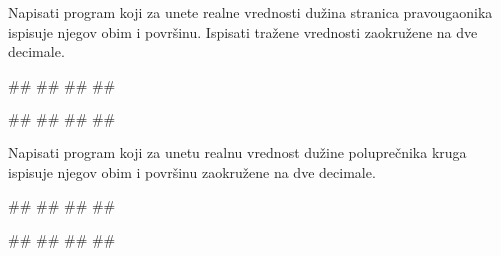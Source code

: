 
\begin{Exercise}[label=UZ_NI_21] 
Napisati program koji za unete realne vrednosti dužina stranica pravougaonika ispisuje 
njegov obim i površinu. Ispisati tražene vrednosti zaokružene na dve decimale.

\begin{miditest}
\begin{upotreba}{1}
#\naslovInt#
##
##
##
\end{upotreba}
\end{miditest}
\begin{miditest}
\begin{upotreba}{2}
#\naslovInt#
##
##
##
\end{upotreba}
\end{miditest}

\end{Exercise}
\ifresenja
\begin{Answer}[ref=UZ_NI_21]
\end{Answer}
\fi


\begin{Exercise}[label=UZ_NI_22] 
Napisati program koji za unetu realnu vrednost dužine poluprečnika kruga ispisuje njegov obim i površinu zaokružene na dve decimale. 
      
\begin{miditest}
\begin{upotreba}{1}
#\naslovInt#
##
##
##
\end{upotreba}
\end{miditest}
\begin{miditest}
\begin{upotreba}{2}
#\naslovInt#
##
##
##
\end{upotreba}
\end{miditest}   
   
\end{Exercise}
\ifresenja
\begin{Answer}[ref=UZ_NI_22]
\end{Answer}
\fi


